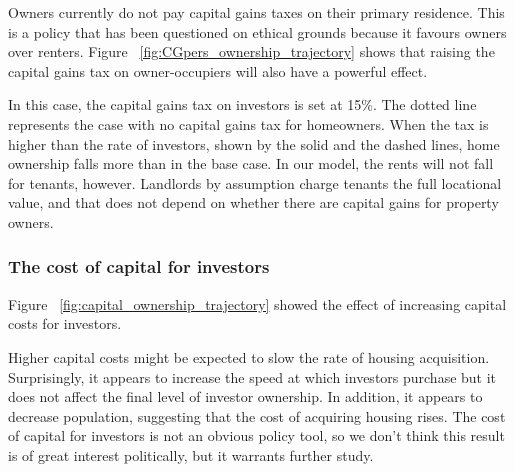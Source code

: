 Owners currently do not pay capital gains taxes on their primary residence. This is a policy that has been questioned on ethical grounds because it favours owners over renters.  Figure ~\ref{fig:CGpers_ownership_trajectory} shows that raising the capital gains tax on owner-occupiers will also have a powerful effect. 

In this case, the capital gains tax on investors is set at 15\%. The dotted line represents the case with no capital gains tax for homeowners. When the tax is higher than the rate of investors, shown by the solid and the dashed lines,  home ownership falls more than in the base case. In our model, the rents will not fall for tenants, however. Landlords by assumption charge tenants the full locational value, and that does not depend on whether there are capital gains for property owners.



\newpage

\subsubsection{The cost of capital for investors}

Figure ~\ref{fig:capital_ownership_trajectory} showed the effect of increasing capital costs for investors. 

Higher capital costs might be expected to slow the rate of housing acquisition. Surprisingly, it appears to increase the speed at which investors purchase but it does not affect the final level of investor ownership.  In addition, it appears to decrease population, suggesting that the cost of acquiring housing rises. The cost of capital for investors is not an obvious policy tool, so we don't think this result is of great interest politically, but it warrants further study.

